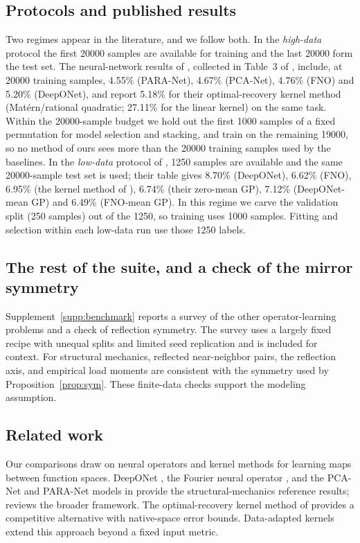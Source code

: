\subsection{Protocols and published results}
Two regimes appear in the literature, and we follow both. In the
\emph{high-data} protocol the first 20000 samples are available for training
and the last 20000 form the test set. The neural-network results of
\citet{dehoop2022cost}, collected in Table~3 of \citet{batlle2024kernel},
include, at 20000 training samples, 4.55\% (PARA-Net), 4.67\% (PCA-Net), 4.76\% (FNO) and 5.20\%
(DeepONet), and \citet{batlle2024kernel} report 5.18\% for their
optimal-recovery kernel method (Mat\'ern/rational quadratic; 27.11\% for the
linear kernel) on the same task. Within the 20000-sample budget we hold out
the first 1000 samples of a fixed permutation for model selection and
stacking, and train on the remaining 19000, so no method of ours sees more
than the 20000 training samples used by the baselines. In the \emph{low-data}
protocol of \citet{mora2025operator}, 1250 samples are available and the same
20000-sample test set is used; their table gives 8.70\% (DeepONet), 6.62\%
(FNO), 6.95\% (the kernel method of \citealt{batlle2024kernel}), 6.74\% (their
zero-mean GP), 7.12\% (DeepONet-mean GP) and 6.49\% (FNO-mean GP). In this
regime we carve the validation split (250 samples) out of the 1250, so
training uses 1000 samples. Fitting and selection within each low-data run
use those 1250 labels.

\subsection{The rest of the suite, and a check of the mirror symmetry}
\label{sec:suite-summary}
Supplement~\ref{supp:benchmark} reports a survey of the other operator-learning
problems and a check of reflection symmetry. The survey uses a largely fixed
recipe with unequal splits and limited seed replication and is included for
context.
For structural mechanics, reflected near-neighbor pairs, the reflection
axis, and empirical load moments are consistent with the symmetry used by
Proposition~\ref{prop:sym}. These finite-data checks support the modeling
assumption.

\subsection{Related work}
\label{sec:related}
Our comparisons draw on neural operators and kernel methods for learning
maps between function spaces. DeepONet \citep{lu2021deeponet}, the Fourier
neural operator \citep{li2021fourier}, and the PCA-Net and PARA-Net models
in \citet{dehoop2022cost} provide the structural-mechanics reference
results; \citet{kovachki2023neural} reviews the broader framework.
The optimal-recovery kernel method of \citet{batlle2024kernel} provides a
competitive alternative with native-space error bounds. Data-adapted
kernels \citep{darcy2023one} extend this approach beyond a fixed input metric.

